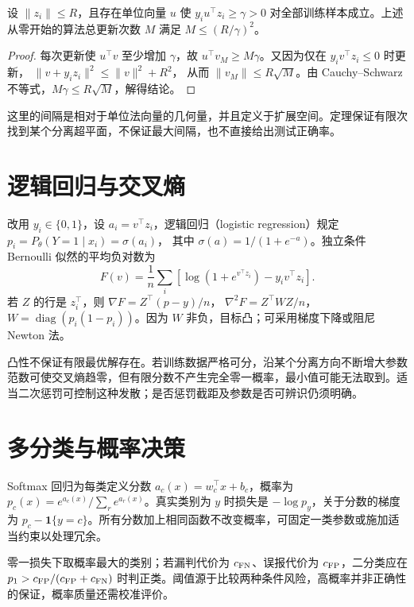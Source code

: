 \documentclass[UTF8,12pt,a4paper,fontset=fandol]{ctexbook}
\begin{document}
\begin{theorem}[感知机的有限更新]
设 $\|z_i\|\leq R$，且存在单位向量 $u$ 使 $y_iu^\top z_i\geq\gamma>0$ 对全部训练样本成立。上述从零开始的算法总更新次数 $M$ 满足 $M\leq(R/\gamma)^2$。
\end{theorem}
\begin{proof}
每次更新使 $u^\top v$ 至少增加 $\gamma$，故 $u^\top v_M\geq M\gamma$。又因为仅在 $y_iv^\top z_i\leq0$ 时更新，
$\|v+y_iz_i\|^2\leq\|v\|^2+R^2$，
从而 $\|v_M\|\leq R\sqrt M$。由 Cauchy--Schwarz 不等式，$M\gamma\leq R\sqrt M$，解得结论。
\end{proof}

这里的间隔是相对于单位法向量的几何量，并且定义于扩展空间。定理保证有限次找到某个分离超平面，不保证最大间隔，也不直接给出测试正确率。

\section{逻辑回归与交叉熵}

改用 $y_i\in\{0,1\}$，设 $a_i=v^\top z_i$，逻辑回归（logistic regression）规定
$p_i=P_\theta(Y=1\mid x_i)=\sigma(a_i)$，
其中 $\sigma(a)=1/(1+e^{-a})$。独立条件 Bernoulli 似然的平均负对数为
\begin{equation}
 F(v)=\frac1n\sum_i[\log(1+e^{v^\top z_i})-y_iv^\top z_i].
 \label{eq:ml-logistic-objective}
\end{equation}
若 $Z$ 的行是 $z_i^\top$，则 $\nabla F=Z^\top(p-y)/n$，
$\nabla^2F=Z^\top WZ/n$，$W=\operatorname{diag}(p_i(1-p_i))$。因为 $W$ 非负，目标凸；可采用梯度下降或阻尼 Newton 法。

凸性不保证有限最优解存在。若训练数据严格可分，沿某个分离方向不断增大参数范数可使交叉熵趋零，但有限分数不产生完全零一概率，最小值可能无法取到。适当二次惩罚可控制这种发散；是否惩罚截距及参数是否可辨识仍须明确。

\section{多分类与概率决策}

Softmax 回归为每类定义分数 $a_c(x)=w_c^\top x+b_c$，概率为 $p_c(x)=e^{a_c(x)}/\sum_re^{a_r(x)}$。真实类别为 $y$ 时损失是 $-\log p_y$，关于分数的梯度为 $p_c-\mathbf1\{y=c\}$。所有分数加上相同函数不改变概率，可固定一类参数或施加适当约束以处理冗余。

零一损失下取概率最大的类别；若漏判代价为 $c_{\rm FN}$、误报代价为 $c_{\rm FP}$，二分类应在
$p_1>c_{\rm FP}/(c_{\rm FP}+c_{\rm FN})$
时判正类。阈值源于比较两种条件风险，高概率并非正确性的保证，概率质量还需校准评价。
\end{document}
